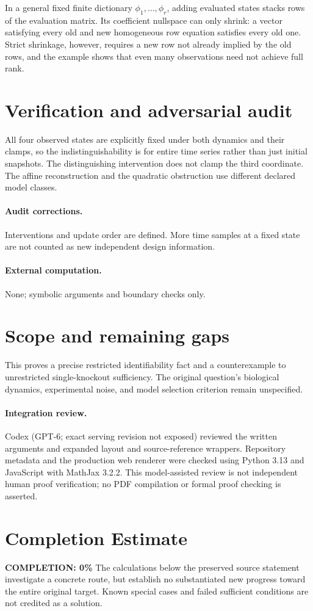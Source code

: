 \documentclass[11pt]{article}
\begin{document}
In a general fixed finite dictionary $\phi_1,\ldots,\phi_r$, adding evaluated states stacks rows of the evaluation matrix. Its coefficient nullspace can only shrink: a vector satisfying every old and new homogeneous row equation satisfies every old one. Strict shrinkage, however, requires a new row not already implied by the old rows, and the example shows that even many observations need not achieve full rank.
\section{Verification and adversarial audit}
All four observed states are explicitly fixed under both dynamics and their clamps, so the indistinguishability is for entire time series rather than just initial snapshots. The distinguishing intervention does not clamp the third coordinate. The affine reconstruction and the quadratic obstruction use different declared model classes.
\paragraph{Audit corrections.} Interventions and update order are defined. More time samples at a fixed state are not counted as new independent design information.
\paragraph{External computation.} None; symbolic arguments and boundary checks only.
\section{Scope and remaining gaps}
This proves a precise restricted identifiability fact and a counterexample to unrestricted single-knockout sufficiency. The original question's biological dynamics, experimental noise, and model selection criterion remain unspecified.
\paragraph{Integration review.} Codex (GPT-6; exact serving revision not exposed) reviewed the written arguments and expanded layout and source-reference wrappers. Repository metadata and the production web renderer were checked using Python 3.13 and JavaScript with MathJax 3.2.2. This model-assisted review is not independent human proof verification; no PDF compilation or formal proof checking is asserted.

\section{Completion Estimate}
\noindent\textbf{COMPLETION: 0\%}
The calculations below the preserved source statement investigate a concrete route,
but establish no substantiated new progress toward the entire original target.
Known special cases and failed sufficient conditions are not credited as a solution.
\end{document}
